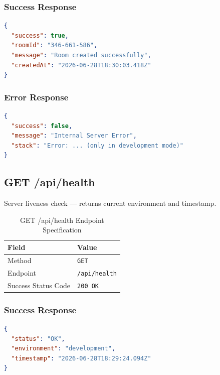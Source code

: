 \documentclass[11pt,a4paper]{article}
\begin{document}
\subsubsection{Success Response}

\begin{lstlisting}[language=json, caption={POST /api/rooms --- 201 Created Response}]
{
  "success": true,
  "roomId": "346-661-586",
  "message": "Room created successfully",
  "createdAt": "2026-06-28T18:30:03.418Z"
}
\end{lstlisting}

\subsubsection{Error Response}

\begin{lstlisting}[language=json, caption={POST /api/rooms --- 500 Internal Server Error}]
{
  "success": false,
  "message": "Internal Server Error",
  "stack": "Error: ... (only in development mode)"
}
\end{lstlisting}


\subsection{GET /api/health}

Server liveness check --- returns current environment and timestamp.

\begin{table}[h!]
\centering
\begin{tabular}{@{}ll@{}}
\toprule
\textbf{Field}      & \textbf{Value} \\ \midrule
Method              & \texttt{GET} \\
Endpoint            & \texttt{/api/health} \\
Success Status Code & \texttt{200 OK} \\ \bottomrule
\end{tabular}
\caption{GET /api/health Endpoint Specification}
\label{tab:get_health}
\end{table}

\subsubsection{Success Response}

\begin{lstlisting}[language=json, caption={GET /api/health --- 200 OK Response}]
{
  "status": "OK",
  "environment": "development",
  "timestamp": "2026-06-28T18:29:24.094Z"
}
\end{lstlisting}
\end{document}
